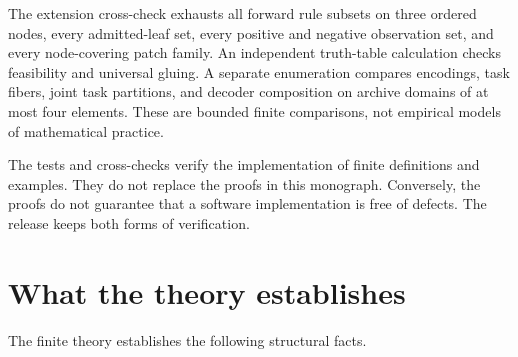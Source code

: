 \documentclass[11pt,oneside]{article}
\theoremstyle{komorebiplain}
\theoremstyle{komorebidefinition}
\theoremstyle{komorebiremark}
\begin{document}
The extension cross-check exhausts all forward rule subsets on three ordered nodes, every admitted-leaf set, every positive and negative observation set, and every node-covering patch family. An independent truth-table calculation checks feasibility and universal gluing. A separate enumeration compares encodings, task fibers, joint task partitions, and decoder composition on archive domains of at most four elements. These are bounded finite comparisons, not empirical models of mathematical practice.

The tests and cross-checks verify the implementation of finite definitions and examples. They do not replace the proofs in this monograph. Conversely, the proofs do not guarantee that a software implementation is free of defects. The release keeps both forms of verification.


\section{What the theory establishes}
\label{sec:old26}

The finite theory establishes the following structural facts.
\end{document}
